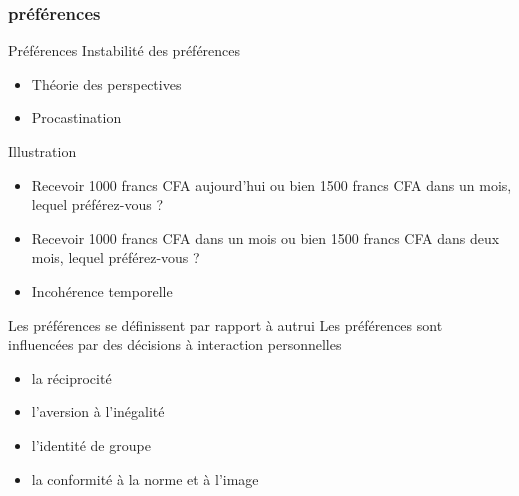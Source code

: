 \documentclass[serif]{beamer}
\begin{document}
\subsubsection{préférences}
\begin{frame}{Préférences}
Instabilité des préférences
\begin{itemize}
	\item Théorie des perspectives
	\item Procastination
\end{itemize}
	 \begin{exampleblock}{Illustration}
	 \begin{itemize}
	 
	 \item[\ding{164}]  Recevoir 1000 francs CFA aujourd’hui ou bien 1500 francs CFA dans un mois, lequel préférez-vous ?
	 \item[\ding{164}] Recevoir 1000 francs CFA dans un mois ou bien 1500 francs CFA dans deux mois, lequel préférez-vous ? 
	\end{itemize} 
	 \end{exampleblock}
	 	\begin{itemize}
	\item Incohérence temporelle		
	\end{itemize}
\end{frame}

\begin{frame}{Les préférences se définissent par rapport à autrui}
Les préférences sont influencées par des décisions à interaction personnelles
\begin{block}{}
	\begin{itemize}
		\item  la réciprocité 
		\item l’aversion à l’inégalité 
		\item l'identité de groupe 
		\item la conformité à la norme et à l’image
		
	\end{itemize}
\end{block}
\end{frame}
\end{document}
